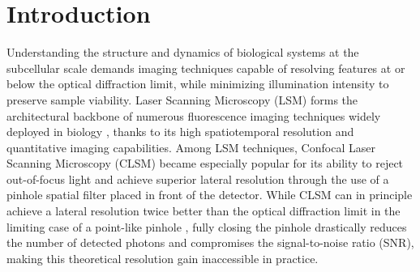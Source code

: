 \documentclass[letterpaper]{article}
\begin{document}








\section{Introduction}

Understanding the structure and dynamics of biological systems at the subcellular scale demands imaging techniques capable of resolving features at or below the optical diffraction limit, while minimizing illumination intensity to preserve sample viability. Laser Scanning Microscopy (LSM) forms the architectural backbone of numerous fluorescence imaging techniques widely deployed in biology \cite{pawley2006handbook}, thanks to its high spatiotemporal resolution and quantitative imaging capabilities. Among LSM techniques, Confocal Laser Scanning Microscopy (CLSM) became especially popular for its ability to reject out-of-focus light and achieve superior lateral resolution through the use of a pinhole spatial filter placed in front of the detector. While CLSM can in principle achieve a lateral resolution twice better than the optical diffraction limit in the limiting case of a point-like pinhole \cite{sheppard2006signal}, fully closing the pinhole drastically reduces the number of detected photons and compromises the signal-to-noise ratio (SNR), making this theoretical resolution gain inaccessible in practice.
\end{document}
